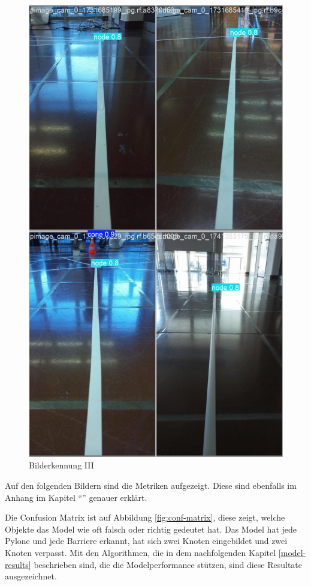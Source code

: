 \begin{figure}[H]
\begin{minipage}[b]{0.28\textwidth}
    \includegraphics[width=\textwidth]{assets/IT/yolo/val_batch2_pred.jpg}
    \caption{Bilderkennung III}
    \label{fig:yolo-iii}
  \end{minipage}
\end{figure}

Auf den folgenden Bildern sind die Metriken aufgezeigt. Diese sind ebenfalls im Anhang im Kapitel ``'' genauer erklärt. 

Die Confusion Matrix ist auf Abbildung \ref{fig:conf-matrix}, diese zeigt, welche Objekte das Model wie oft falsch oder richtig gedeutet hat. Das Model hat jede Pylone und jede Barriere erkannt, hat sich zwei Knoten eingebildet und zwei Knoten verpasst. Mit den Algorithmen, die in dem nachfolgenden Kapitel \ref{model-results} beschrieben sind, die die Modelperformance stützen, sind diese Resultate ausgezeichnet. 


